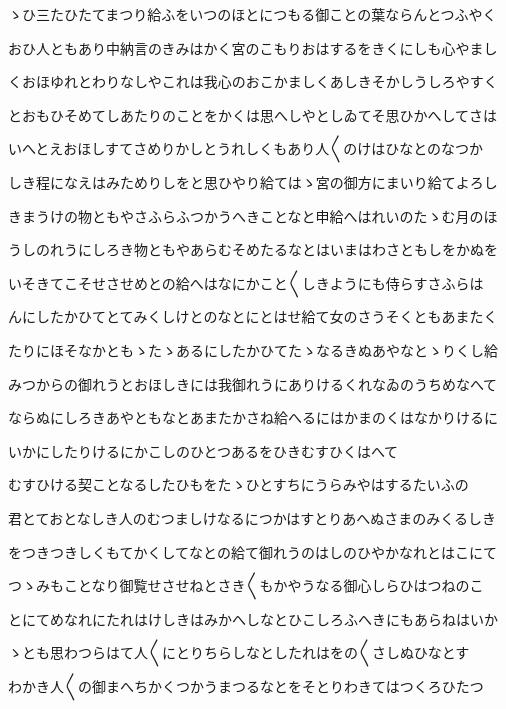 \documentclass[a4paper,11pt,landscape]{ltjtarticle}
\begin{document}
\par\medskip
ゝひ三たひたてまつり給ふをいつのほとにつもる御ことの葉ならんとつふやく
\par\medskip
おひ人ともあり中納言のきみはかく宮のこもりおはするをきくにしも心やまし
\par\medskip
くおほゆれとわりなしやこれは我心のおこかましくあしきそかしうしろやすく
\par\medskip
とおもひそめてしあたりのことをかくは思へしやとしゐてそ思ひかへしてさは
\par\medskip
いへとえおほしすてさめりかしとうれしくもあり人〱のけはひなとのなつか
\par\medskip
しき程になえはみためりしをと思ひやり給てはゝ宮の御方にまいり給てよろし
\par\medskip
きまうけの物ともやさふらふつかうへきことなと申給へはれいのたゝむ月のほ
\par\medskip
うしのれうにしろき物ともやあらむそめたるなとはいまはわさともしをかぬを
\par\medskip
いそきてこそせさせめとの給へはなにかこと〱しきようにも侍らすさふらは
\par\medskip
んにしたかひてとてみくしけとのなとにとはせ給て女のさうそくともあまたく
\par\medskip
たりにほそなかともゝたゝあるにしたかひてたゝなるきぬあやなとゝりくし給
\par\medskip
みつからの御れうとおほしきには我御れうにありけるくれなゐのうちめなへて
\par\medskip
ならぬにしろきあやともなとあまたかさね給へるにはかまのくはなかりけるに
\par\medskip
いかにしたりけるにかこしのひとつあるをひきむすひくはへて
\par\medskip
むすひける契ことなるしたひもをたゝひとすちにうらみやはするたいふの
\par\medskip
君とておとなしき人のむつましけなるにつかはすとりあへぬさまのみくるしき
\par\medskip
をつきつきしくもてかくしてなとの給て御れうのはしのひやかなれとはこにて
\par\medskip
つゝみもことなり御覧せさせねとさき〱もかやうなる御心しらひはつねのこ
\par\medskip
とにてめなれにたれはけしきはみかへしなとひこしろふへきにもあらねはいか
\par\medskip
ゝとも思わつらはて人〱にとりちらしなとしたれはをの〱さしぬひなとす
\par\medskip
わかき人〱の御まへちかくつかうまつるなとをそとりわきてはつくろひたつ
\par\medskip
\end{document}
